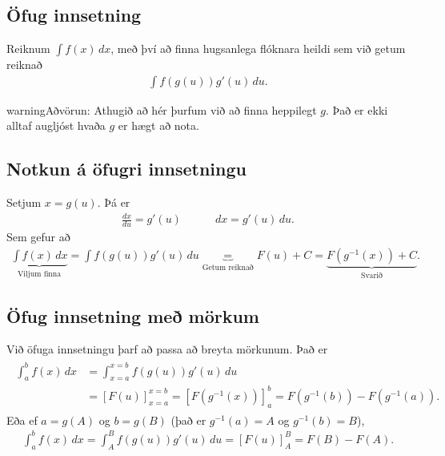\documentclass[b5paper,11pt,icelandic]{sphinxmanual}
\begin{document}
\subsection{Öfug innsetning}
\label{kafli06:ofug-innsetning}\label{kafli06:index-10}
Reiknum \(\int f(x)\, dx\), með því að finna hugsanlega flóknara
heildi sem við getum reiknað
\begin{equation*}
\begin{split}\int f(g(u))g'(u)\, du.\end{split}
\end{equation*}
\begin{notice}{warning}{Aðvörun:}
Athugið að hér þurfum við að finna heppilegt \(g\). Það
er ekki alltaf augljóst hvaða \(g\) er hægt að nota.
\end{notice}


\subsection{Notkun á öfugri innsetningu}
\label{kafli06:notkun-a-ofugri-innsetningu}
Setjum \(x=g(u)\). Þá er
\begin{equation*}
\begin{split}\frac{dx}{du}=g'(u)\qquad\quad dx=g'(u)\,du.\end{split}
\end{equation*}
Sem gefur að
\begin{equation*}
\begin{split}\underbrace{\int f(x)\,dx}_{\text{Viljum finna}}  =
\int f(g(u))g'(u)\,du \underbrace{=}_{\text{Getum reiknað}} F(u) + C
= \underbrace{F(g^{-1}(x)) + C}_{\text{Svarið}}.\end{split}
\end{equation*}

\subsection{Öfug innsetning með mörkum}
\label{kafli06:ofug-innsetning-me-morkum}
Við öfuga innsetningu þarf að passa að breyta mörkunum. Það er
\begin{equation*}
\begin{split}\begin{aligned}
\int_a^b f(x)\,dx    &= \int_{x=a}^{x=b} f(g(u))g'(u)\,du  \\
&= [F(u)]_{x=a}^{x=b} = [F(g^{-1}(x))]_a^b = F(g^{-1}(b)) - F(g^{-1}(a)).\end{aligned}\end{split}
\end{equation*}
Eða ef \(a=g(A)\) og \(b=g(B)\) (það er \(g^{-1}(a) = A\) og
\(g^{-1}(b) = B\)),
\begin{equation*}
\begin{split}\int_a^b f(x)\,dx  = \int_A^B f(g(u))g'(u)\,du= [F(u)]_A^B = F(B) - F(A).\end{split}
\end{equation*}
\end{document}
